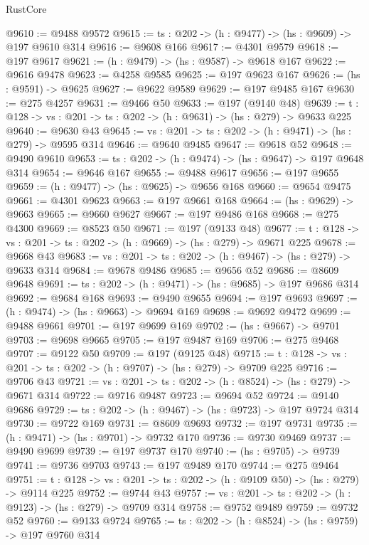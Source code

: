 \begin{lexlean}{RustCore}
\begin{coremodule}
@9610 := @9488 @9572
@9615 := {ts : @202} -> (h : @9477) -> (hs : @9609) -> @197 @9610 @314
@9616 := @9608 @166
@9617 := @4301 @9579
@9618 := @197 @9617
@9621 := (h : @9479) -> (hs : @9587) -> @9618 @167
@9622 := @9616 @9478
@9623 := @4258 @9585
@9625 := @197 @9623 @167
@9626 := (hs : @9591) -> @9625
@9627 := @9622 @9589
@9629 := @197 @9485 @167
@9630 := @275 @4257
@9631 := @9466 @50
@9633 := @197 (@9140 @48)
@9639 := {t : @128} -> {vs : @201} -> {ts : @202} -> (h : @9631) -> (hs : @279) -> @9633 @225
@9640 := @9630 @43
@9645 := {vs : @201} -> {ts : @202} -> (h : @9471) -> (hs : @279) -> @9595 @314
@9646 := @9640 @9485
@9647 := @9618 @52
@9648 := @9490 @9610
@9653 := {ts : @202} -> (h : @9474) -> (hs : @9647) -> @197 @9648 @314
@9654 := @9646 @167
@9655 := @9488 @9617
@9656 := @197 @9655
@9659 := (h : @9477) -> (hs : @9625) -> @9656 @168
@9660 := @9654 @9475
@9661 := @4301 @9623
@9663 := @197 @9661 @168
@9664 := (hs : @9629) -> @9663
@9665 := @9660 @9627
@9667 := @197 @9486 @168
@9668 := @275 @4300
@9669 := @8523 @50
@9671 := @197 (@9133 @48)
@9677 := {t : @128} -> {vs : @201} -> {ts : @202} -> (h : @9669) -> (hs : @279) -> @9671 @225
@9678 := @9668 @43
@9683 := {vs : @201} -> {ts : @202} -> (h : @9467) -> (hs : @279) -> @9633 @314
@9684 := @9678 @9486
@9685 := @9656 @52
@9686 := @8609 @9648
@9691 := {ts : @202} -> (h : @9471) -> (hs : @9685) -> @197 @9686 @314
@9692 := @9684 @168
@9693 := @9490 @9655
@9694 := @197 @9693
@9697 := (h : @9474) -> (hs : @9663) -> @9694 @169
@9698 := @9692 @9472
@9699 := @9488 @9661
@9701 := @197 @9699 @169
@9702 := (hs : @9667) -> @9701
@9703 := @9698 @9665
@9705 := @197 @9487 @169
@9706 := @275 @9468
@9707 := @9122 @50
@9709 := @197 (@9125 @48)
@9715 := {t : @128} -> {vs : @201} -> {ts : @202} -> (h : @9707) -> (hs : @279) -> @9709 @225
@9716 := @9706 @43
@9721 := {vs : @201} -> {ts : @202} -> (h : @8524) -> (hs : @279) -> @9671 @314
@9722 := @9716 @9487
@9723 := @9694 @52
@9724 := @9140 @9686
@9729 := {ts : @202} -> (h : @9467) -> (hs : @9723) -> @197 @9724 @314
@9730 := @9722 @169
@9731 := @8609 @9693
@9732 := @197 @9731
@9735 := (h : @9471) -> (hs : @9701) -> @9732 @170
@9736 := @9730 @9469
@9737 := @9490 @9699
@9739 := @197 @9737 @170
@9740 := (hs : @9705) -> @9739
@9741 := @9736 @9703
@9743 := @197 @9489 @170
@9744 := @275 @9464
@9751 := {t : @128} -> {vs : @201} -> {ts : @202} -> (h : @9109 @50) -> (hs : @279) -> @9114 @225
@9752 := @9744 @43
@9757 := {vs : @201} -> {ts : @202} -> (h : @9123) -> (hs : @279) -> @9709 @314
@9758 := @9752 @9489
@9759 := @9732 @52
@9760 := @9133 @9724
@9765 := {ts : @202} -> (h : @8524) -> (hs : @9759) -> @197 @9760 @314

\end{coremodule}
\end{lexlean}
